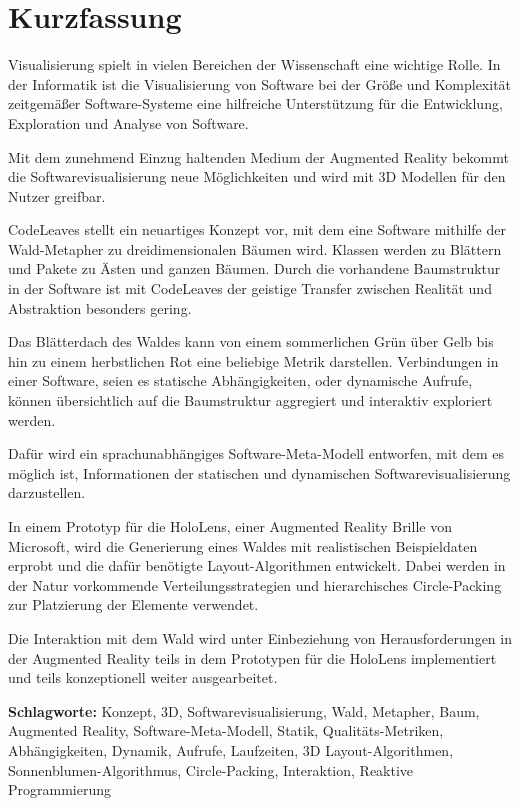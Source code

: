 \chapter*{Kurzfassung}
\thispagestyle{empty}

Visualisierung spielt in vielen Bereichen der Wissenschaft eine wichtige Rolle. In der Informatik ist die Visualisierung von Software bei der Größe und Komplexität zeitgemäßer Software-Systeme eine hilfreiche Unterstützung für die Entwicklung, Exploration und Analyse von Software.

Mit dem zunehmend Einzug haltenden Medium der Augmented Reality bekommt die Softwarevisualisierung neue Möglichkeiten und wird mit 3D Modellen für den Nutzer greifbar.

CodeLeaves stellt ein neuartiges Konzept vor, mit dem eine Software mithilfe der Wald-Metapher zu dreidimensionalen Bäumen wird. Klassen werden zu Blättern und Pakete zu Ästen und ganzen Bäumen. Durch die vorhandene Baumstruktur in der Software ist mit CodeLeaves der geistige Transfer zwischen Realität und Abstraktion besonders gering.

Das Blätterdach des Waldes kann von einem sommerlichen Grün über Gelb bis hin zu einem herbstlichen Rot eine beliebige Metrik darstellen. Verbindungen in einer Software, seien es statische Abhängigkeiten, oder dynamische Aufrufe, können übersichtlich auf die Baumstruktur aggregiert und interaktiv exploriert werden.

Dafür wird ein sprachunabhängiges Software-Meta-Modell entworfen, mit dem es möglich ist, Informationen der statischen und dynamischen Softwarevisualisierung darzustellen.

In einem Prototyp für die HoloLens, einer Augmented Reality Brille von Microsoft, wird die Generierung eines Waldes mit realistischen Beispieldaten erprobt und die dafür benötigte Layout-Algorithmen entwickelt. Dabei werden in der Natur vorkommende Verteilungsstrategien und hierarchisches Circle-Packing zur Platzierung der Elemente verwendet.

Die Interaktion mit dem Wald wird unter Einbeziehung von Herausforderungen in der Augmented Reality teils in dem Prototypen für die HoloLens implementiert und teils konzeptionell weiter ausgearbeitet.

\bigskip
\noindent \textbf{Schlagworte:} Konzept, 3D, Softwarevisualisierung, Wald, Metapher, Baum, Augmented Reality, Software-Meta-Modell, Statik, Qualitäts-Metriken, Abhängigkeiten, Dynamik, Aufrufe, Laufzeiten, 3D Layout-Algorithmen, Sonnenblumen-Algorithmus, Circle-Packing, Interaktion, Reaktive Programmierung
